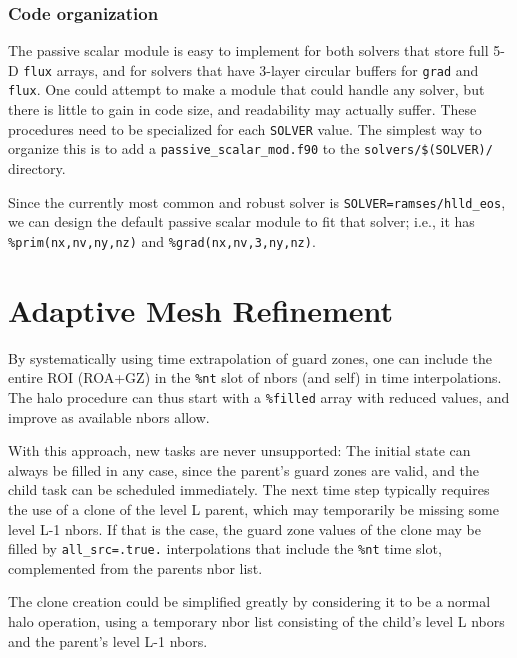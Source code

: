 \documentclass[paper=a4,fontsize=11pt]{scrartcl}
\numberwithin{equation}{section}		%
\numberwithin{figure}{section}			%
\numberwithin{table}{section}				%
\newcommand{\codecolor}{\color{Blue}}
\newcommand{\filecolor}{\color{NavyBlue}}
\newcommand{\File}[1]{{\filecolor\texttt{#1}}}
\newcommand{\Code}[1]{{\codecolor\texttt{#1}}}
\begin{document}
\subsubsection{Code organization}
The passive scalar module is easy to implement for both solvers that store full 5-D \verb|flux| arrays, and for solvers that have 3-layer circular buffers for \verb|grad| and \verb|flux|.  One could attempt to make a module that could handle any solver, but there is little to gain in code size, and readability may actually suffer.
These procedures need to be specialized for each \verb|SOLVER| value.  The simplest way to organize this is to add a \File{passive\_scalar\_mod.f90} to the \verb|solvers/$(SOLVER)/| directory.

Since the currently most common and robust solver is \verb|SOLVER=ramses/hlld_eos|, we can design the default passive scalar module to fit that solver; i.e., it has \verb|%prim(nx,nv,ny,nz)| and \verb|%grad(nx,nv,3,ny,nz)|.

\section{Adaptive Mesh Refinement}
By systematically using time extrapolation of guard zones, one can include the entire ROI (ROA+GZ) in the \Code{\%nt} slot of nbors (and self) in time interpolations.  The halo procedure can thus start with a \Code{\%filled} array with reduced values, and improve as available nbors allow. 

With this approach, new tasks are never unsupported: The initial state can always be filled in any case, since the parent's guard zones are valid, and the child task can be scheduled immediately.  The next time step typically requires the use of a clone of the level L parent, which may temporarily be missing some level L-1 nbors. If that is the case, the guard zone values of the clone may be filled by \Code{all\_src=.true.} interpolations that include the \Code{\%nt} time slot, complemented from the parents nbor list.

The clone creation could be simplified greatly by considering it to be a normal halo operation, using a temporary nbor list consisting of the child's level L nbors and the parent's level L-1 nbors.
\end{document}
